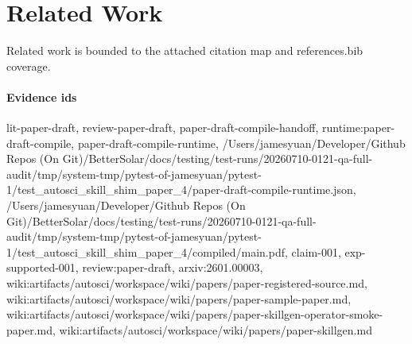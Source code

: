 \section{Related Work}
Related work is bounded to the attached citation map and references.bib coverage.

\paragraph{Evidence ids} lit-paper-draft, review-paper-draft, paper-draft-compile-handoff, runtime:paper-draft-compile, paper-draft-compile-runtime, /Users/jamesyuan/Developer/Github Repos (On Git)/BetterSolar/docs/testing/test-runs/20260710-0121-qa-full-audit/tmp/system-tmp/pytest-of-jamesyuan/pytest-1/test\_autosci\_skill\_shim\_paper\_4/paper-draft-compile-runtime.json, /Users/jamesyuan/Developer/Github Repos (On Git)/BetterSolar/docs/testing/test-runs/20260710-0121-qa-full-audit/tmp/system-tmp/pytest-of-jamesyuan/pytest-1/test\_autosci\_skill\_shim\_paper\_4/compiled/main.pdf, claim-001, exp-supported-001, review:paper-draft, arxiv:2601.00003, wiki:artifacts/autosci/workspace/wiki/papers/paper-registered-source.md, wiki:artifacts/autosci/workspace/wiki/papers/paper-sample-paper.md, wiki:artifacts/autosci/workspace/wiki/papers/paper-skillgen-operator-smoke-paper.md, wiki:artifacts/autosci/workspace/wiki/papers/paper-skillgen.md
